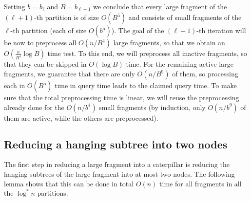 \documentclass[a4paper,UKenglish]{lipics-v2016}
\theoremstyle{plain}
\begin{document}
Setting $b=b_{\ell}$ and $B=b_{\ell+1}$  we conclude that every large fragment of the $(\ell+1)$-th partition is of size $O(B^5)$ and consists
of small fragments of the $\ell$-th partition (each of size $O(b^5)$). 
The goal of the $(\ell+1)$-th iteration will be now to preprocess all $O(n/B^{4})$ large fragments, so that we obtain an $O(\frac{n}{B^{4}}\log B)$
time test. To this end, we will preprocess all inactive fragments, so that they can be skipped in $O(\log B)$ time. For the remaining active
large fragments, we guarantee that there are only $O(n/B^{9})$ of them, so processing each in $O(B^{5})$ time in query time leads
to the claimed query time. To make sure that the total preprocessing time is linear, we will reuse the preprocessing already done
for the $O(n/b^{4})$ small fragments (by induction, only $O(n/b^{9})$ of them are active, while the others are preprocessed).

\subsection{Reducing a hanging subtree into two nodes}\label{section:lemma1}
The first step in reducing a large fragment into a caterpillar is reducing the hanging subtrees of the large fragment into at most two nodes. The following lemma shows that this can be done in total $O(n)$ time for all fragments in all the $\log^* n$ partitions.
\end{document}
